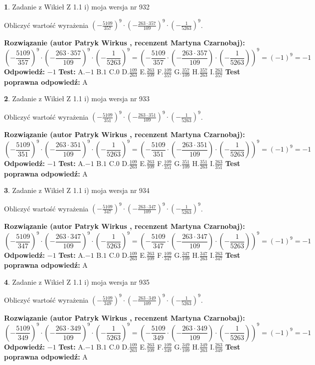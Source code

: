 \documentclass[12pt, a4paper]{article}
\theoremstyle{definition} %
\newtheorem{zad}{}
\newcommand{\zadStart}[1]{\begin{zad}#1\newline}
\newcommand{\zadStop}{\end{zad}}
\newcommand{\rozwStart}[2]{\noindent \textbf{Rozwiązanie (autor #1 , recenzent #2): }\newline}
\newcommand{\rozwStop}{\newline}
\newcommand{\odpStart}{\noindent \textbf{Odpowiedź:}\newline}
\newcommand{\odpStop}{\newline}
\newcommand{\testStart}{\noindent \textbf{Test:}\newline}
\newcommand{\testStop}{\newline}
\newcommand{\kluczStart}{\noindent \textbf{Test poprawna odpowiedź:}\newline}
\newcommand{\kluczStop}{\newline}
\begin{document}
\zadStart{Zadanie z Wikieł Z 1.1 i) moja wersja nr 932}

Obliczyć wartość wyrażenia $(-\frac{5109}{357})^{9} \cdot (-\frac{263 \cdot 357}{109})^{9} \cdot (-\frac{1}{5263})^{9}$.
\zadStop
\rozwStart{Patryk Wirkus}{Martyna Czarnobaj}
$$(-\frac{5109}{357})^{9} \cdot (-\frac{263 \cdot 357}{109})^{9} \cdot (-\frac{1}{5263})^{9} = (-\frac{5109}{357} \cdot (-\frac{263 \cdot 357}{109}) \cdot (-\frac{1}{5263}))^{9} = (-1)^{9} = -1$$
\rozwStop
\odpStart
$-1$
\odpStop
\testStart
A.$-1$ B.$1$ C.$0$ D.$\frac{109}{263}$ E.$\frac{263}{109}$
F.$\frac{109}{357}$ G.$\frac{357}{109}$
H.$\frac{357}{263}$
I.$\frac{263}{357}$
\testStop
\kluczStart
A
\kluczStop



\zadStart{Zadanie z Wikieł Z 1.1 i) moja wersja nr 933}

Obliczyć wartość wyrażenia $(-\frac{5109}{351})^{9} \cdot (-\frac{263 \cdot 351}{109})^{9} \cdot (-\frac{1}{5263})^{9}$.
\zadStop
\rozwStart{Patryk Wirkus}{Martyna Czarnobaj}
$$(-\frac{5109}{351})^{9} \cdot (-\frac{263 \cdot 351}{109})^{9} \cdot (-\frac{1}{5263})^{9} = (-\frac{5109}{351} \cdot (-\frac{263 \cdot 351}{109}) \cdot (-\frac{1}{5263}))^{9} = (-1)^{9} = -1$$
\rozwStop
\odpStart
$-1$
\odpStop
\testStart
A.$-1$ B.$1$ C.$0$ D.$\frac{109}{263}$ E.$\frac{263}{109}$
F.$\frac{109}{351}$ G.$\frac{351}{109}$
H.$\frac{351}{263}$
I.$\frac{263}{351}$
\testStop
\kluczStart
A
\kluczStop



\zadStart{Zadanie z Wikieł Z 1.1 i) moja wersja nr 934}

Obliczyć wartość wyrażenia $(-\frac{5109}{347})^{9} \cdot (-\frac{263 \cdot 347}{109})^{9} \cdot (-\frac{1}{5263})^{9}$.
\zadStop
\rozwStart{Patryk Wirkus}{Martyna Czarnobaj}
$$(-\frac{5109}{347})^{9} \cdot (-\frac{263 \cdot 347}{109})^{9} \cdot (-\frac{1}{5263})^{9} = (-\frac{5109}{347} \cdot (-\frac{263 \cdot 347}{109}) \cdot (-\frac{1}{5263}))^{9} = (-1)^{9} = -1$$
\rozwStop
\odpStart
$-1$
\odpStop
\testStart
A.$-1$ B.$1$ C.$0$ D.$\frac{109}{263}$ E.$\frac{263}{109}$
F.$\frac{109}{347}$ G.$\frac{347}{109}$
H.$\frac{347}{263}$
I.$\frac{263}{347}$
\testStop
\kluczStart
A
\kluczStop



\zadStart{Zadanie z Wikieł Z 1.1 i) moja wersja nr 935}

Obliczyć wartość wyrażenia $(-\frac{5109}{349})^{9} \cdot (-\frac{263 \cdot 349}{109})^{9} \cdot (-\frac{1}{5263})^{9}$.
\zadStop
\rozwStart{Patryk Wirkus}{Martyna Czarnobaj}
$$(-\frac{5109}{349})^{9} \cdot (-\frac{263 \cdot 349}{109})^{9} \cdot (-\frac{1}{5263})^{9} = (-\frac{5109}{349} \cdot (-\frac{263 \cdot 349}{109}) \cdot (-\frac{1}{5263}))^{9} = (-1)^{9} = -1$$
\rozwStop
\odpStart
$-1$
\odpStop
\testStart
A.$-1$ B.$1$ C.$0$ D.$\frac{109}{263}$ E.$\frac{263}{109}$
F.$\frac{109}{349}$ G.$\frac{349}{109}$
H.$\frac{349}{263}$
I.$\frac{263}{349}$
\testStop
\kluczStart
A
\kluczStop
\end{document}
